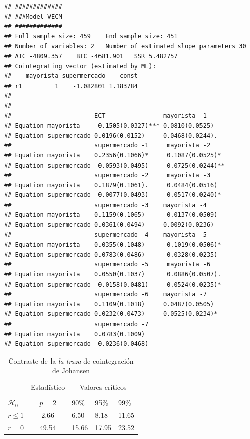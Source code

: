 \documentclass[12pt, twoside]{book}\usepackage[]{graphicx}\usepackage[]{color}
\makeatletter
\newenvironment{kframe}{%
 \def\at@end@of@kframe{}%
 \ifinner\ifhmode%
  \def\at@end@of@kframe{\end{minipage}}%
  \begin{minipage}{\columnwidth}%
 \fi\fi%
 \def\FrameCommand##1{\hskip\@totalleftmargin \hskip-\fboxsep
 \colorbox{shadecolor}{##1}\hskip-\fboxsep
     \hskip-\linewidth \hskip-\@totalleftmargin \hskip\columnwidth}%
 \MakeFramed {\advance\hsize-\width
   \@totalleftmargin\z@ \linewidth\hsize
   \@setminipage}}%
 {\par\unskip\endMakeFramed%
 \at@end@of@kframe}
\newenvironment{knitrout}{}{} %
\numberwithin{equation}{section}
\numberwithin{theorem}{section}
\numberwithin{teorema}{section}
\numberwithin{defi}{section}
\numberwithin{prop}{section}
\numberwithin{defi}{section}
\theoremstyle{plain}
\makeatother
\begin{document}
\begin{knitrout}
\color{fgcolor}\begin{kframe}
\begin{verbatim}
## #############
## ###Model VECM 
## #############
## Full sample size: 459 	End sample size: 451
## Number of variables: 2 	Number of estimated slope parameters 30
## AIC -4809.357 	BIC -4681.901 	SSR 5.482757
## Cointegrating vector (estimated by ML):
##    mayorista supermercado    const
## r1         1    -1.082801 1.183784
## 
## 
##                       ECT                mayorista -1      
## Equation mayorista    -0.1505(0.0327)*** 0.0810(0.0525)    
## Equation supermercado 0.0196(0.0152)     0.0468(0.0244).   
##                       supermercado -1     mayorista -2     
## Equation mayorista    0.2356(0.1066)*     0.1087(0.0525)*  
## Equation supermercado -0.0593(0.0495)     0.0725(0.0244)** 
##                       supermercado -2     mayorista -3      
## Equation mayorista    0.1879(0.1061).     0.0484(0.0516)    
## Equation supermercado -0.0077(0.0493)     0.0517(0.0240)*   
##                       supermercado -3    mayorista -4       
## Equation mayorista    0.1159(0.1065)     -0.0137(0.0509)    
## Equation supermercado 0.0361(0.0494)     0.0092(0.0236)     
##                       supermercado -4    mayorista -5       
## Equation mayorista    0.0355(0.1048)     -0.1019(0.0506)*   
## Equation supermercado 0.0783(0.0486)     -0.0328(0.0235)    
##                       supermercado -5     mayorista -6     
## Equation mayorista    0.0550(0.1037)      0.0886(0.0507).  
## Equation supermercado -0.0158(0.0481)     0.0524(0.0235)*  
##                       supermercado -6    mayorista -7      
## Equation mayorista    0.1109(0.1018)     0.0487(0.0505)    
## Equation supermercado 0.0232(0.0473)     0.0525(0.0234)*   
##                       supermercado -7    
## Equation mayorista    0.0783(0.1009)     
## Equation supermercado -0.0236(0.0468)
\end{verbatim}
\end{kframe}
\end{knitrout}


\begin{table}[H]
\begin{center}
\begin{tabular}{@{}lrllll@{}}
\toprule
\multicolumn{1}{l}{} & \multicolumn{2}{c}{Estadístico} &
\multicolumn{3}{c}{Valores críticos} \\
\cmidrule(l){2-3} \cmidrule(l){4-6} \\
\multicolumn{1}{l}{$\mathcal{H}_0$} & \multicolumn{2}{c}{$p = 2$} &
\multicolumn{1}{l}{90\%}&
\multicolumn{1}{l}{95\%}&
\multicolumn{1}{l}{99\%}
\\
\midrule
$r \leq 1$  & \multicolumn{2}{c}{  2.66}  & 6.50 & 8.18 & 11.65\\
$r = 0$     & \multicolumn{2}{c}{ 49.54}  & 15.66 & 17.95 & 23.52\\
\bottomrule
\end{tabular}
\end{center}
\caption{Contraste de la \textit{la traza} de cointegración de Johansen}
\label{tab-10}
\end{table}
\end{document}
